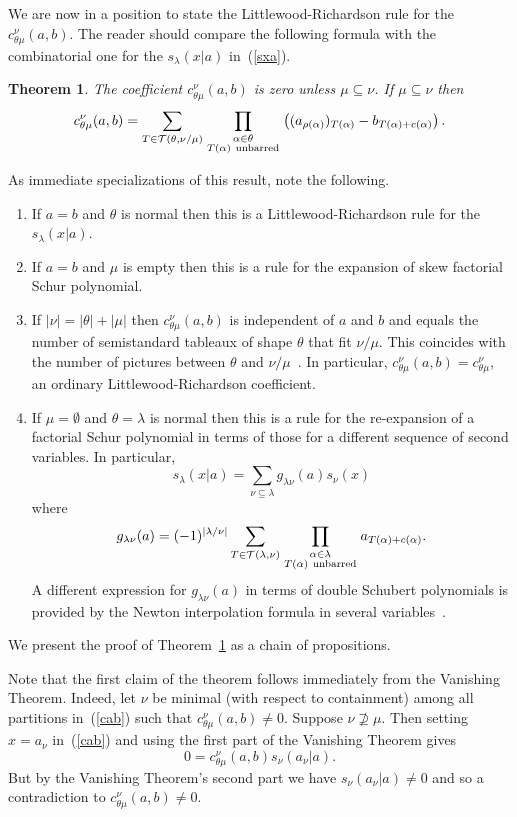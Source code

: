 \documentclass[titlepage,12pt]{article}
\newcommand{\ben}{\begin{enumerate}}
\newcommand{\een}{\end{enumerate}}
\newcommand{\bth}{\begin{thm}}
\renewcommand{\eth}{\end{thm}}
\newcommand{\emp}{\emptyset}
\newcommand{\la}{\lambda}
\newcommand{\0}{{\bf 0}}
\newcommand{\1}{{\bf 1}}
\newcommand{\2}{{\bf 2}}
\newcommand{\3}{{\bf 3}}
\newcommand{\4}{{\bf 4}}
\newcommand{\5}{{\bf 5}}
\newcommand{\6}{{\bf 6}}
\newcommand{\7}{{\bf 7}}
\newcommand{\8}{{\bf 8}}
\newcommand{\9}{{\bf 9}}
\newcommand{\cT}{{\cal T}}
\newcommand{\scl}{\scriptstyle}
\newcommand{\scz}{\scriptsize}
\newtheorem{thm}{Theorem}[section]
\begin{document}
We are now in a position to state the Littlewood-Richardson rule for
the $c_{\theta\mu}^{\nu}(a,b)$.
The reader should compare the following formula with the combinatorial
one for the $s_\la(x|a)$ in~(\ref{sxa}).

\bth				\label{lrab}
The coefficient $c_{\theta\mu}^{\nu}(a,b)$ is zero
unless $\mu\subseteq\nu$. If $\mu\subseteq\nu$ then
$$
c^{\nu}_{\theta\mu}(a,b)=\sum_{T\in\cT(\theta,\nu/\mu)}
\prod_{\scl\alpha\in\theta\atop \scl T(\alpha)\ \mbox{\scz unbarred}}
\left((a_{\rho(\alpha)})_{T(\alpha)}-b_{T(\alpha)+c(\alpha)}\right).
$$
\eth


As immediate specializations of this result, note the following.
\ben
\item If $a=b$ and $\theta$ is normal then this is a
Littlewood-Richardson rule for the $s_\la(x|a)$.
\item If $a=b$ and $\mu$ is empty then this is a rule for the expansion of
skew factorial Schur polynomial.
\item If $|\nu|=|\theta|+|\mu|$ then $c_{\theta\mu}^{\nu}(a,b)$ is
independent
of $a$ and $b$ and equals the number of semistandard tableaux of shape
$\theta$ that fit $\nu/\mu$. This coincides with the number of pictures
between
$\theta$ and $\nu/\mu$~\cite{jp:sss,zel:glr}.   In particular,
$c_{\theta\mu}^{\nu}(a,b)=c_{\theta\mu}^{\nu}$, an ordinary
Littlewood-Richardson coefficient.
\item If $\mu=\emp$ and $\theta=\la$ is normal then this is a rule for
the re-expansion of a factorial Schur polynomial in terms of those
for a different sequence of second variables. In particular,
$$
s_{\lambda}(x|a)=\sum_{\nu\subseteq\lambda}g_{\lambda\nu}(a)
s_{\nu}(x)
$$
where
$$
g_{\lambda\nu}(a)=(-1)^{|\lambda/\nu|}
\sum_{T\in\cT(\lambda,\nu)}
\prod_{\scl\alpha\in\lambda\atop \scl T(\alpha)\ \mbox{\scz unbarred}}
a_{T(\alpha)+c(\alpha)}.
$$
A different expression for $g_{\lambda\nu}(a)$ in terms of double
Schubert polynomials is provided by
the Newton interpolation formula in several variables~\cite{ls:in}.
\een 

We present the proof of Theorem~\ref{lrab} as a chain of propositions.

Note that the first claim of the theorem
follows immediately from the Vanishing Theorem. Indeed,
let $\nu$ be minimal (with respect to containment) among all
partitions in~(\ref{cab}) such that $c_{\theta\mu}^{\nu}(a,b)\ne 0$. 
Suppose
$\nu\not\supseteq \mu$. Then setting $x=a_{\nu}$ in~(\ref{cab}) and using
the first part of the Vanishing Theorem gives
$$
0=c_{\theta\mu}^{\nu}(a,b)s_{\nu}(a_{\nu}|a).
$$
But by the Vanishing Theorem's second part we have
$s_{\nu}(a_{\nu}|a)\ne 0$ and so a contradiction to
$c_{\theta\mu}^{\nu}(a,b)\ne 0$.
\end{document}
